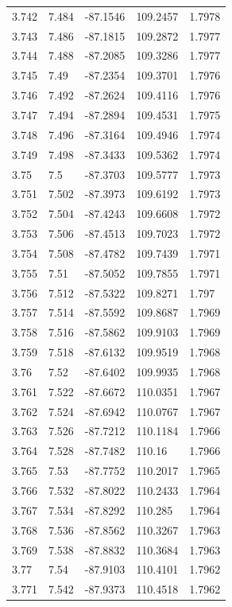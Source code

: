 \begin{tabular}{lllll}
3.742 & 7.484 & -87.1546 & 109.2457 & 1.7978 \\
3.743 & 7.486 & -87.1815 & 109.2872 & 1.7977 \\
3.744 & 7.488 & -87.2085 & 109.3286 & 1.7977 \\
3.745 & 7.49 & -87.2354 & 109.3701 & 1.7976 \\
3.746 & 7.492 & -87.2624 & 109.4116 & 1.7976 \\
3.747 & 7.494 & -87.2894 & 109.4531 & 1.7975 \\
3.748 & 7.496 & -87.3164 & 109.4946 & 1.7974 \\
3.749 & 7.498 & -87.3433 & 109.5362 & 1.7974 \\
3.75 & 7.5 & -87.3703 & 109.5777 & 1.7973 \\
3.751 & 7.502 & -87.3973 & 109.6192 & 1.7973 \\
3.752 & 7.504 & -87.4243 & 109.6608 & 1.7972 \\
3.753 & 7.506 & -87.4513 & 109.7023 & 1.7972 \\
3.754 & 7.508 & -87.4782 & 109.7439 & 1.7971 \\
3.755 & 7.51 & -87.5052 & 109.7855 & 1.7971 \\
3.756 & 7.512 & -87.5322 & 109.8271 & 1.797 \\
3.757 & 7.514 & -87.5592 & 109.8687 & 1.7969 \\
3.758 & 7.516 & -87.5862 & 109.9103 & 1.7969 \\
3.759 & 7.518 & -87.6132 & 109.9519 & 1.7968 \\
3.76 & 7.52 & -87.6402 & 109.9935 & 1.7968 \\
3.761 & 7.522 & -87.6672 & 110.0351 & 1.7967 \\
3.762 & 7.524 & -87.6942 & 110.0767 & 1.7967 \\
3.763 & 7.526 & -87.7212 & 110.1184 & 1.7966 \\
3.764 & 7.528 & -87.7482 & 110.16 & 1.7966 \\
3.765 & 7.53 & -87.7752 & 110.2017 & 1.7965 \\
3.766 & 7.532 & -87.8022 & 110.2433 & 1.7964 \\
3.767 & 7.534 & -87.8292 & 110.285 & 1.7964 \\
3.768 & 7.536 & -87.8562 & 110.3267 & 1.7963 \\
3.769 & 7.538 & -87.8832 & 110.3684 & 1.7963 \\
3.77 & 7.54 & -87.9103 & 110.4101 & 1.7962 \\
3.771 & 7.542 & -87.9373 & 110.4518 & 1.7962 \\

\end{tabular}
